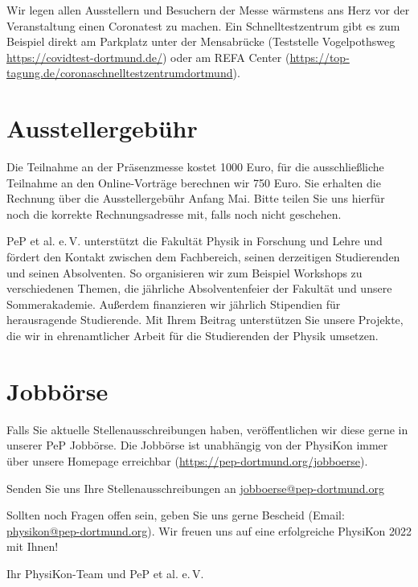 \documentclass[
  paper=a4,
  fontsize=12pt,
  DIV=16,
  headheight=30pt,
  footheight=45pt,
  headinclude,
  parskip=half,
]{scrartcl}
\begin{document}
Wir legen allen Ausstellern und Besuchern der Messe wärmstens ans Herz vor der Veranstaltung einen Coronatest zu machen.
Ein Schnelltestzentrum gibt es zum Beispiel direkt am Parkplatz unter der Mensabrücke (Teststelle Vogelpothsweg \url{https://covidtest-dortmund.de/}) oder am REFA Center (\url{https://top-tagung.de/coronaschnelltestzentrumdortmund}).


\section*{Ausstellergebühr}
Die Teilnahme an der Präsenzmesse kostet 1000 Euro, für die ausschließliche Teilnahme an den Online-Vorträge berechnen wir 750 Euro.
Sie erhalten die Rechnung über die Ausstellergebühr Anfang Mai.
Bitte teilen Sie uns hierfür noch die korrekte Rechnungsadresse mit, falls noch nicht geschehen.


PeP et al. e.\,V. unterstützt die Fakultät Physik in Forschung und Lehre und fördert den Kontakt zwischen dem Fachbereich, seinen derzeitigen Studierenden und seinen Absolventen.
So organisieren wir zum Beispiel Workshops zu verschiedenen Themen, die jährliche Absolventenfeier der Fakultät und unsere Sommerakademie.
Außerdem finanzieren wir jährlich Stipendien für herausragende Studierende.
Mit Ihrem Beitrag unterstützen Sie unsere Projekte, die wir in ehrenamtlicher Arbeit für die Studierenden der Physik umsetzen.

\section*{Jobbörse}

Falls Sie aktuelle Stellenausschreibungen haben, veröffentlichen wir diese gerne in unserer PeP Jobbörse.
Die Jobbörse ist unabhängig von der PhysiKon immer über unsere Homepage erreichbar (\url{https://pep-dortmund.org/jobboerse}).

Senden Sie uns Ihre Stellenausschreibungen an \href{mailto:jobboerse@pep-dortmund.org}{jobboerse@pep-dortmund.org}



Sollten noch Fragen offen sein, geben Sie uns gerne Bescheid (Email: \href{mailto:physikon@pep-dortmund.org}{physikon@pep-dortmund.org}).
Wir freuen uns auf eine erfolgreiche PhysiKon 2022 mit Ihnen!

\vspace{1cm}
Ihr PhysiKon-Team und PeP et al. e.\,V.
\end{document}
